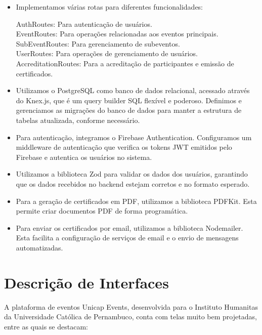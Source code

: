 \begin{itemize}
\begin{itemize}
\item Implementamos várias rotas para diferentes funcionalidades:

    AuthRoutes: Para autenticação de usuários.\\
    EventRoutes: Para operações relacionadas aos eventos principais.\\
    SubEventRoutes: Para gerenciamento de subeventos.\\
    UserRoutes: Para operações de gerenciamento de usuários.\\
    AccreditationRoutes: Para a acreditação de participantes e emissão de certificados.

\item Utilizamos o PostgreSQL como banco de dados relacional, acessado através do Knex.js, que é um query builder SQL flexível e poderoso. Definimos e gerenciamos as migrações do banco de dados para manter a estrutura de tabelas atualizada, conforme necessário.

\item Para autenticação, integramos o Firebase Authentication. Configuramos um middleware de autenticação que verifica os tokens JWT emitidos pelo Firebase e autentica os usuários no sistema.

\item Utilizamos a biblioteca Zod para validar os dados dos usuários, garantindo que os dados recebidos no backend estejam corretos e no formato esperado.

\item Para a geração de certificados em PDF, utilizamos a biblioteca PDFKit. Esta permite criar documentos PDF de forma programática.

\item Para enviar os certificados por email, utilizamos a biblioteca Nodemailer. Esta facilita a configuração de serviços de email e o envio de mensagens automatizadas.

\end{itemize}

\section{Descrição de Interfaces}

A plataforma de eventos Unicap Events, desenvolvida para o Instituto Humanitas da Universidade Católica de Pernambuco, conta com telas muito bem projetadas, entre as quais se destacam:



\end{itemize}

